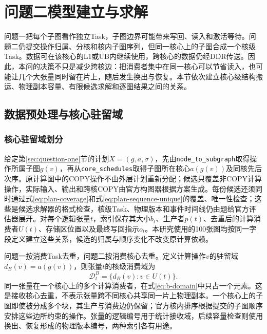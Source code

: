 \section{问题二模型建立与求解}
\label{sec:question-two}

问题一把每个子图看作独立Task，子图边界可能带来写回、读入和激活等待。问题二仍提交操作归属、分核和核内子图序列，但同一核心上的子图合成一个核级Task。数据可在该核心的L1或UB内继续使用，跨核心的数据仍经DDR传送。因此，本问的决策不只是减少跨核边：把消费者集中在同一核心可以节省读入，也可能让几个大张量同时留在片上，随后发生换出与恢复。本节依次建立核心级结构搬运、物理副本容量、有限候选求解和逐图结果之间的关系。

\subsection{数据预处理与核心驻留域}
\subsubsection{核心驻留域划分}
给定第\ref{sec:question-one}节的计划$X=(g,a,\sigma)$，先由\texttt{node\_to\_subgraph}取得操作所属子图$g(v)$，再从\texttt{core\_schedules}取得子图所在核心$a(g(v))$及同核先后次序。原计算图中的COPY操作不由外层计划重新分配；候选只覆盖非COPY计算操作，实际输入、输出和跨核COPY由官方构图器根据方案生成。每份候选还须同时通过式\eqref{eq:plan-coverage}和式\eqref{eq:plan-sequence-unique}的覆盖、唯一性检查；这些是候选求解器的格式检查，核级Task、物理版本和事件时间线仍由题给官方评估器展开。对每个逻辑张量$t$，索引保存其大小$b_t$、生产者$p(t)$、去重后的计算消费者$U(t)$、存储区位置以及最终写回指示$o_t$。本研究使用的100张图均按同一字段定义建立这些关系，候选的归属与顺序变化不改变原计算依赖。

问题一按消费Task去重，问题二按消费核心去重。定义计算操作$v$的驻留域$d_B(v)=a(g(v))$，则张量$t$的核级消费域为
\begin{equation}
\mathcal D_t^B=\{d_B(v):v\in U(t)\}.
\label{eq:b-domain}
\end{equation}
同一张量在一个核心上的多个计算消费者，在式\eqref{eq:b-domain}中只占一个元素。这是接收核心去重，不表示张量跨不同核心共享同一片上物理副本。一个核心上的子图即使被分成多个块，其生产与消费边仍保留；官方核内排序根据提交的子图顺序安排这些边所约束的操作。张量的逻辑编号用于统计接收域，后续容量检查则使用换出、恢复形成的物理版本编号，两种索引各有用途。


